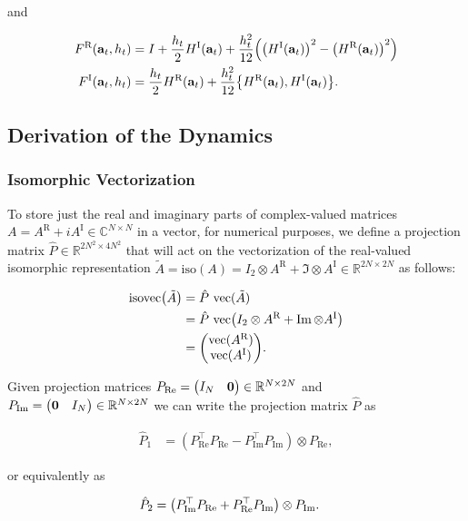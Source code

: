 \documentclass{article}
\newcommand{\isovec}{\text{isovec}}
\newcommand{\HI}{H^{\text{I}}}
\newcommand{\HR}{H^{\text{R}}}
\newcommand{\FR}{F^{\text{R}}}
\newcommand{\FI}{F^{\text{I}}}
\newcommand{\AR}{A^{\text{R}}}
\newcommand{\AI}{A^{\text{I}}}
\newcommand{\Pre}{P_{\text{Re}}}
\newcommand{\Pim}{P_{\text{Im}}}
\begin{document}
\noindent
and

\begin{align*}
  \FR(\vb{a}_t, h_t) &= I + \frac{h_t}{2} \HI(\vb{a}_t) + \frac{h_t^2}{12}\qty(\qty(\HI(\vb{a}_t))^2 - \qty(\HR(\vb{a}_t))^2) \\
  \FI(\vb{a}_t, h_t) &= \frac{h_t}{2} \HR(\vb{a}_t) + \frac{h_t^2}{12}\qty{\HR(\vb{a}_t),\HI(\vb{a}_t)}.
\end{align*}


\newpage

\subsection{Derivation of the Dynamics}

\subsubsection*{Isomorphic Vectorization}

To store just the real and imaginary parts of complex-valued matrices $A = \AR + i \AI \in \mathbb{C}^{N \times N}$ in a vector, for numerical purposes,  we define a projection matrix $\hat P \in \mathbb{R}^{2N^2 \times 4N^2}$ that will act on the vectorization of the real-valued isomorphic representation $\tilde A = \text{iso}(A) = I_2 \otimes \AR + \Im \otimes \AI \in \mathbb{R}^{2N \times 2N}$ as follows: 

\begin{align*}
  \isovec\qty(\tilde A)
  &= \hat P \ \text{vec}(\tilde A) \\
  &= \hat P \ \text{vec}\qty(I_2 \otimes \AR + \Im \otimes \AI) \\
  &= \mqty(\text{vec}(\AR) \\ \text{vec}(\AI)).
\end{align*}

Given projection matrices $\Pre = \mqty(I_N & \vb{0}) \in \mathbb{R}^{N \times 2N}$ and $\Pim = \mqty(\vb{0} & I_N) \in \mathbb{R}^{N \times 2N}$ we can write the projection matrix $\hat P$ as

\begin{align*}
  \hat P_1 &= (\Pre^\top\Pre - \Pim^\top\Pim) \otimes \Pre, 
\end{align*}

\noindent
or equivalently as

\begin{align*}
  \hat P_2 &= \qty(\Pim^\top\Pre + \Pre^\top\Pim) \otimes \Pim.
\end{align*}
\end{document}

